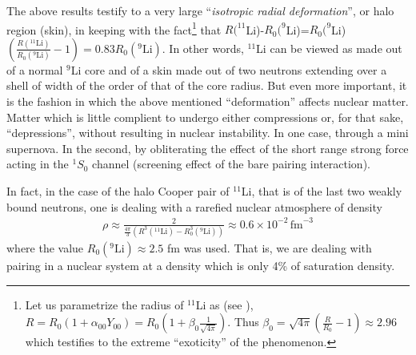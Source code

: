 The above results testify to a very large ``\emph{isotropic radial deformation}'', 
 or halo region (skin), in keeping with the fact\footnote{\label{f155C4} 
 	 Let us  parametrize the radius of $^{11}$Li as (see \cite{Bohr:75}), $R=R_0(1+\alpha_{00}Y_{00})=R_0(1+\beta_{0}\frac{1}{\sqrt{4\pi}})$. Thus $\beta_0=\sqrt{4\pi}(\frac{R}{R_0}-1)\approx 2.96$ which testifies to the extreme ``exoticity'' of the phenomenon.} that $R(^{11}$Li)-$R_0(^{9}$Li)=$R_0(^{9}$Li)$(\frac{R(^{11}\text{Li})}{R_0(^9\text{Li})}-1)=0.83R_0(^9\text{Li})$. In other words, $^{11}$Li can be viewed as made out of a normal $^{9}$Li core and of a skin made out of two neutrons   extending over a shell of width of the order of that of the core radius. But even more important, it is the fashion in which the above mentioned ``deformation'' affects nuclear matter. Matter  which is little complient to undergo either compressions or, for that sake, ``depressions'', without resulting in nuclear instability. In one case, through a mini supernova. In the second, by obliterating the effect of the short range strong force acting in the $^1S_0$ channel (screening effect of the bare pairing interaction).


In fact, in the case of the halo Cooper pair of $^{11}$Li, that is of the last two weakly bound neutrons, one is dealing with a rarefied nuclear atmosphere of density
\begin{align}\label{eq5App3E}
\rho\approx\frac{2}{\frac{4\pi}{3}(R^3(^{11}\text{Li})-R_0^3(^{9}\text{Li}))}\approx 0.6\times 10^{-2}\,\text{fm}^{-3}
\end{align}
where the value $R_0(^9\text{Li})\approx 2.5$ fm was used. That is, we are dealing with pairing in a nuclear system at a density which is only 4\% of saturation density.

